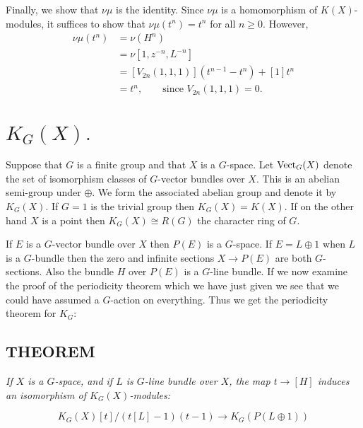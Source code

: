 Finally, we show that $\nu\mu$ is the identity. Since $\nu\mu$ is a homomorphism of $K(X)$-modules, it suffices to show that $\nu\mu(t^n) = t^n$ for all $n \geq 0$. However,
\begin{align*}
    \nu\mu(t^n) &= \nu(H^n) \\
    &= \nu[1, z^{-n}, L^{-n}] \\
    &= [V_{2n}(1, 1, 1)](t^{n-1} - t^n) + [1]t^n \\
    &= t^n, \qquad \text{since } V_{2n}(1, 1, 1) = 0 .
\end{align*}

\newpage


\section{$K_G(X).$} Suppose that $G$ is a finite group and that $X$ is a $G$-space. Let $\operatorname{Vect}_G(X)$ denote the set of isomorphism classes of $G$-vector bundles over $X$. This is an abelian semi-group under $\oplus$. We form the associated abelian group and denote it by $K_G(X)$. If $G = 1$ is the trivial group then $K_G(X) = K(X)$. If on the other hand $X$ is a point then $K_G(X) \cong R(G)$ the character ring of $G$. \par 

If $E$ is a $G$-vector bundle over $X$ then $P(E)$ is a $G$-space. If $E = L \oplus 1$ when $L$ is a $G$-bundle then the zero and infinite sections $X \to P(E)$ are both $G$-sections. Also the bundle $H$ over $P(E)$ is a $G$-line bundle. If we now examine the proof of the periodicity theorem which we have just given we see that we could have assumed a $G$-action on everything. Thus we get the periodicity theorem for $K_G$: \par 

\subsection{THEOREM}\label{the:2.3.1} \textit{If $X$ is a $G$-space, and if $L$ is $G$-line bundle over $X$, the map $t \to [H]$ induces an isomorphism of $K_G(X)$-modules:}

\begin{equation*}
    K_G(X)[t]/(t[L]-1)(t-1) \to K_G(P(L \oplus 1))
\end{equation*}

\newpage


